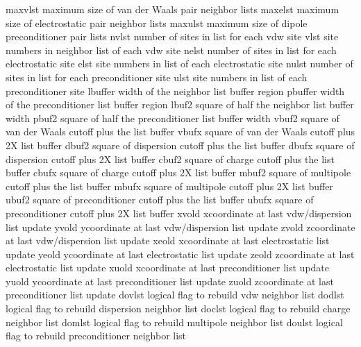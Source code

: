 \documentclass[letterpaper,11pt,english]{sphinxmanual}
\begin{document}
\begin{sphinxVerbatim}[commandchars=\\\{\}]
maxvlst         maximum size of van der Waals pair neighbor lists
maxelst         maximum size of electrostatic pair neighbor lists
maxulst         maximum size of dipole preconditioner pair lists
nvlst           number of sites in list for each vdw site
vlst            site numbers in neighbor list of each vdw site
nelst           number of sites in list for each electrostatic site
elst            site numbers in list of each electrostatic site
nulst           number of sites in list for each preconditioner site
ulst            site numbers in list of each preconditioner site
lbuffer         width of the neighbor list buffer region
pbuffer         width of the preconditioner list buffer region
lbuf2           square of half the neighbor list buffer width
pbuf2           square of half the preconditioner list buffer width
vbuf2           square of van der Waals cutoff plus the list buffer
vbufx           square of van der Waals cutoff plus 2X list buffer
dbuf2           square of dispersion cutoff plus the list buffer
dbufx           square of dispersion cutoff plus 2X list buffer
cbuf2           square of charge cutoff plus the list buffer
cbufx           square of charge cutoff plus 2X list buffer
mbuf2           square of multipole cutoff plus the list buffer
mbufx           square of multipole cutoff plus 2X list buffer
ubuf2           square of preconditioner cutoff plus the list buffer
ubufx           square of preconditioner cutoff plus 2X list buffer
xvold           x\PYGZhy{}coordinate at last vdw/dispersion list update
yvold           y\PYGZhy{}coordinate at last vdw/dispersion list update
zvold           z\PYGZhy{}coordinate at last vdw/dispersion list update
xeold           x\PYGZhy{}coordinate at last electrostatic list update
yeold           y\PYGZhy{}coordinate at last electrostatic list update
zeold           z\PYGZhy{}coordinate at last electrostatic list update
xuold           x\PYGZhy{}coordinate at last preconditioner list update
yuold           y\PYGZhy{}coordinate at last preconditioner list update
zuold           z\PYGZhy{}coordinate at last preconditioner list update
dovlst          logical flag to rebuild vdw neighbor list
dodlst          logical flag to rebuild dispersion neighbor list
doclst          logical flag to rebuild charge neighbor list
domlst          logical flag to rebuild multipole neighbor list
doulst          logical flag to rebuild preconditioner neighbor list
\end{sphinxVerbatim}
\end{document}
